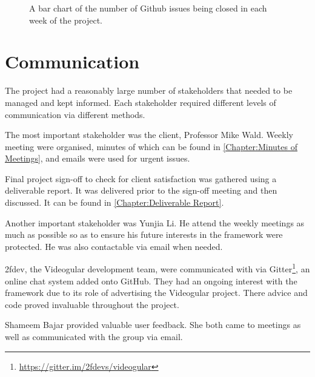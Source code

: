 \begin{figure}
\centering
{}
  \caption{A bar chart of the number of Github issues being closed in each week of the project.}
  \label{fig:tasksweek}
\end{figure}

\section{Communication} 
\label{Section:Communication}

The project had a reasonably large number of stakeholders that needed to be managed and kept informed. Each stakeholder required different levels of communication via different methods.

The most important stakeholder was the client, Professor Mike Wald. Weekly meeting were organised, minutes of which can be found in \autoref{Chapter:Minutes of Meetings}, and emails were used for urgent issues. 

Final project sign-off to check for client satisfaction was gathered using a deliverable report. It was delivered prior to the sign-off meeting and then discussed. It can be found in \autoref{Chapter:Deliverable Report}.

Another important stakeholder was Yunjia Li. He attend the weekly meetings as much as possible so as to ensure his future interests in the framework were protected. He was also contactable via email when needed.

2fdev, the Videogular development team, were communicated with via Gitter\footnote{\url{https://gitter.im/2fdevs/videogular}}, an online chat system added onto GitHub. They had an ongoing interest with the framework due to its role of advertising the Videogular project.  There advice and code proved invaluable throughout the project.

Shameem Bajar provided valuable user feedback. She both came to meetings as well as communicated with the group via email.
